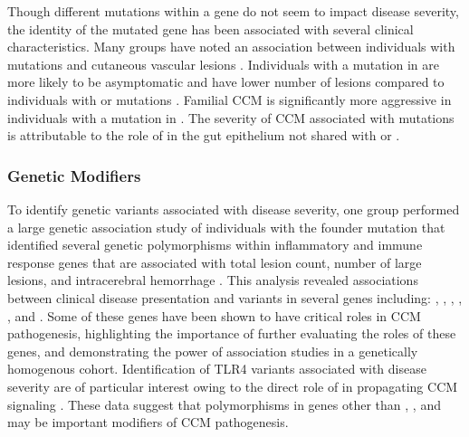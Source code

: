 Though different mutations within a gene do not seem to impact disease severity, the identity of the mutated gene has been associated with several clinical characteristics. Many groups have noted an association between individuals with  mutations and cutaneous vascular lesions \citep{gianfrancesco2007, sirvente2009, musunuru2003, grippaudo2013, wang2013, eerola2000, labauge1999}. Individuals with a mutation in  are more likely to be asymptomatic and have lower number of lesions compared to individuals with  or  mutations \citep{denier2006}. Familial CCM is significantly more aggressive in individuals with a mutation in  \citep{fauth2015, shenkar2015, riant2013}. The severity of CCM associated with  mutations is attributable to the role of  in the gut epithelium not shared with  or  \citep{tang2019}. 

\subsubsection{Genetic Modifiers}
To identify genetic variants associated with disease severity, one group performed a large genetic association study of individuals with the  founder mutation that identified several genetic polymorphisms within inflammatory and immune response genes that are associated with total lesion count, number of large lesions, and intracerebral hemorrhage \citep{choquet2014}. This analysis revealed associations between clinical disease presentation and variants in several genes including: , , , , , and . Some of these genes have been shown to have critical roles in CCM pathogenesis, highlighting the importance of further evaluating the roles of these genes, and demonstrating the power of association studies in a genetically homogenous cohort. Identification of TLR4 variants associated with disease severity are of particular interest owing to the direct role of  in propagating CCM signaling \citep{tang2019}. These data suggest that polymorphisms in genes other than , , and  may be important modifiers of CCM pathogenesis. 

